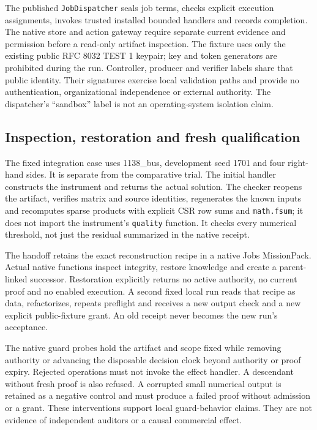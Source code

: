 The published \texttt{JobDispatcher} seals job terms, checks explicit execution assignments, invokes trusted installed bounded handlers and records completion. The native store and action gateway require separate current evidence and permission before a read-only artifact inspection. The fixture uses only the existing public RFC 8032 TEST 1 keypair; key and token generators are prohibited during the run. \citep{rfc8032} Controller, producer and verifier labels share that public identity. Their signatures exercise local validation paths and provide no authentication, organizational independence or external authority. The dispatcher's ``sandbox'' label is not an operating-system isolation claim.

\subsection{Inspection, restoration and fresh qualification}
The fixed integration case uses 1138\_bus, development seed 1701 and four right-hand sides. It is separate from the comparative trial. The initial handler constructs the instrument and returns the actual solution. The checker reopens the artifact, verifies matrix and source identities, regenerates the known inputs and recomputes sparse products with explicit CSR row sums and \texttt{math.fsum}; it does not import the instrument's \texttt{quality} function. It checks every numerical threshold, not just the residual summarized in the native receipt.

The handoff retains the exact reconstruction recipe in a native Jobs MissionPack. Actual native functions inspect integrity, restore knowledge and create a parent-linked successor. Restoration explicitly returns no active authority, no current proof and no enabled execution. A second fixed local run reads that recipe as data, refactorizes, repeats preflight and receives a new output check and a new explicit public-fixture grant. An old receipt never becomes the new run's acceptance.

The native guard probes hold the artifact and scope fixed while removing authority or advancing the disposable decision clock beyond authority or proof expiry. Rejected operations must not invoke the effect handler. A descendant without fresh proof is also refused. A corrupted small numerical output is retained as a negative control and must produce a failed proof without admission or a grant. These interventions support local guard-behavior claims. They are not evidence of independent auditors or a causal commercial effect.

